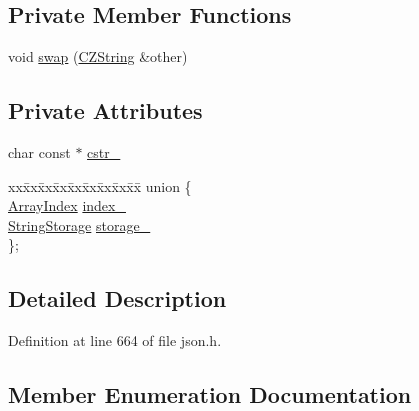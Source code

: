 \subsection*{Private Member Functions}
\begin{DoxyCompactItemize}
\item 
void \hyperlink{class_json_1_1_value_1_1_c_z_string_ad59f3542d2eea749a6a63409d1a02207}{swap} (\hyperlink{class_json_1_1_value_1_1_c_z_string}{C\+Z\+String} \&other)
\end{DoxyCompactItemize}
\subsection*{Private Attributes}
\begin{DoxyCompactItemize}
\item 
char const  $\ast$ \hyperlink{class_json_1_1_value_1_1_c_z_string_a5b4d28349294034d7f779c3c95d0306c}{cstr\+\_\+}
\item 
\begin{tabbing}
xx\=xx\=xx\=xx\=xx\=xx\=xx\=xx\=xx\=\kill
union \{\\
\>\hyperlink{class_json_1_1_value_a184a91566cccca7b819240f0d5561c7d}{ArrayIndex} \hyperlink{class_json_1_1_value_1_1_c_z_string_aecf29982235c9c165a0971023ebbb270}{index\_}\\
\>\hyperlink{struct_json_1_1_value_1_1_c_z_string_1_1_string_storage}{StringStorage} \hyperlink{class_json_1_1_value_1_1_c_z_string_a17c92f0f089a4314e3b1d5695dc1a851}{storage\_}\\
\}; \\

\end{tabbing}\end{DoxyCompactItemize}


\subsection{Detailed Description}


Definition at line 664 of file json.\+h.



\subsection{Member Enumeration Documentation}
\mbox{\label{class_json_1_1_value_1_1_c_z_string_a2805c46fb4a72bbaed55de6d75941b6d}} 
